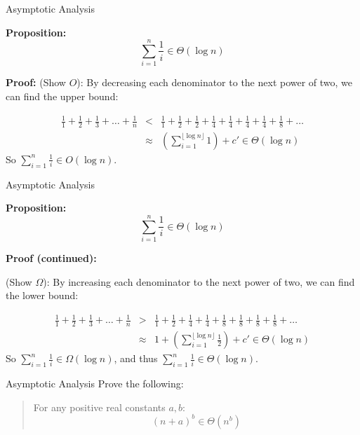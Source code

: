 \documentclass[9pt]{beamer}
\begin{document}
\begin{frame}[fragile]{Asymptotic Analysis}

  {\bf Proposition:}
  \[\sum_{i=1}^n \frac{1}{i} \in \Theta(\log{n})\]

  {\bf Proof:}
  (Show $O$): By decreasing each denominator to the next power of two, we
  can find the upper bound:

  \begin{eqnarray*}
    \frac{1}{1} + \frac{1}{2} + \frac{1}{3} + \dots + \frac{1}{n} &<&
    \frac{1}{1} + \frac{1}{2} + \frac{1}{2} + \frac{1}{4} + \frac{1}{4} +
    \frac{1}{4} + \frac{1}{4} + \frac{1}{8} + \dots \\
    &\approx& \left(\sum_{i=1}^{\lfloor\log{n}\rfloor} 1\right) + c' \in
    \Theta(\log{n})
  \end{eqnarray*}
  So $\sum_{i=1}^n\frac{1}{i} \in O(\log{n})$.
\end{frame}

\begin{frame}[fragile]{Asymptotic Analysis}

  {\bf Proposition:}
  \[\sum_{i=1}^n \frac{1}{i} \in \Theta(\log{n})\]

  {\bf Proof (continued):}

  (Show $\Omega$): By increasing each denominator to the next power of two,
  we can find the lower bound:

  \begin{eqnarray*}
    \frac{1}{1} + \frac{1}{2} + \frac{1}{3} + \dots + \frac{1}{n} &>&
    \frac{1}{1} + \frac{1}{2} + \frac{1}{4} + \frac{1}{4} + \frac{1}{8} +
    \frac{1}{8} + \frac{1}{8} + \frac{1}{8} + \dots \\
    &\approx& 1 + \left(\sum_{i=1}^{\lfloor\log{n}\rfloor}
    \frac{1}{2}\right) + c' \in \Theta(\log{n})
  \end{eqnarray*}
  So $\sum_{i=1}^n\frac{1}{i} \in \Omega(\log{n})$, and thus
  $\sum_{i=1}^n\frac{1}{i} \in \Theta(\log{n})$.

\end{frame}

\begin{frame}[fragile]{Asymptotic Analysis}
  Prove the following:

  \begin{quote}
    For any positive real constants $a, b$:
    \[(n+a)^b \in \Theta(n^b)\]
  \end{quote}

\end{frame}
\end{document}
